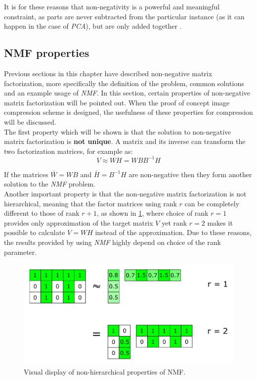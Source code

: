 \documentclass[thesis=M,english]{FITthesis}[2012/10/20]
\begin{document}
It is for these reasons that non-negativity is a powerful and meaningful
constraint, as parts are never subtracted from the particular instance
(as it can happen in the case of \emph{PCA}), but are only added together \cite{nmf-phd-thesis}.
\\


\subsection{NMF properties}
Previous sections in this chapter have described non-negative matrix factorization,
more specifically the definition of the problem, common solutions and an example
usage of \emph{NMF}. In this section, certain properties of non-negative matrix
factorization will be pointed out. When the proof of concept image compression scheme
is designed, the usefulness of these properties for compression will be discussed.
\\

The first property which will be shown is that the solution to non-negative matrix
factorization is \textbf{not unique}. A matrix and its inverse can transform the two
factorization matrices, for example as:
\begin{equation}
  V \approx WH = WBB^{-1}H
\end{equation}

If the matrices $\bar{W} = WB$ and $\bar{H} = B^{-1}H$ are non-negative then they
form another solution to the \emph{NMF} problem.\cite{nmf-nonuniq}
\\

Another important property is that the non-negative matrix factorization is not
hierarchical, meaning that the factor matrices using rank $r$ can be completely
different to those of rank $r+1$, as shown in \ref{fig:nmf-hierarchy}, where choice of
rank $r = 1$ provides only approximation of the target matrix $V$ yet rank $r = 2$ makes it
possible to calculate $V = WH$ instead of the approximation. Due to these
reasons, the results provided by using \emph{NMF} highly depend on choice of the rank
parameter.
\\

\begin{figure}[h]
  \centering
  \caption{Visual display of non-hierarchical properties of NMF. \cite{nonhierarchy}}
  \label{fig:nmf-hierarchy}
  \includegraphics[scale=0.7]{non-hierarchical}
\end{figure}
\end{document}
